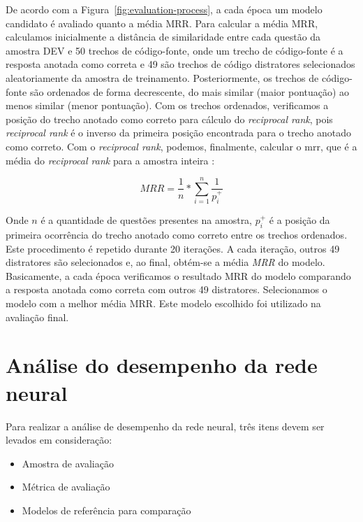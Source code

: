 De acordo com a Figura~\ref{fig:evaluation-process}, a cada época um modelo candidato é avaliado quanto a média MRR. Para calcular a média MRR, calculamos inicialmente a distância de similaridade entre cada questão da amostra DEV e 50 trechos de código-fonte, onde um trecho de código-fonte é a resposta anotada como correta e 49 são trechos de código distratores selecionados aleatoriamente da amostra de treinamento.  Posteriormente, os trechos de código-fonte são ordenados de forma decrescente, do mais similar (maior pontuação) ao menos similar (menor pontuação). Com os trechos ordenados, verificamos a posição do trecho anotado como correto para cálculo do \textit{reciprocal rank}, pois \textit{reciprocal rank} é o inverso da primeira posição encontrada para o trecho anotado como correto. Com o \textit{reciprocal rank}, podemos, finalmente, calcular o \acrshort{mrr}, que é a média do \textit{reciprocal rank} para a amostra inteira \citep{Gu-deep-code-search:2018}:

\begin{equation}\label{eq:mrr}
MRR = \frac{1}{n} * \sum_{i = 1}^{n}\frac{1}{p_{i}^{+}}    
\end{equation}

Onde $n$ é a quantidade de questões presentes na amostra, $p_{i}^{+}$ é a posição da primeira ocorrência do trecho anotado como correto entre os trechos ordenados. Este procedimento é repetido durante 20 iterações. A cada iteração, outros 49 distratores são selecionados e, ao final, obtém-se a média \emph{MRR} do modelo. Basicamente, a cada época verificamos o resultado MRR do modelo comparando a resposta anotada como correta com outros 49 distratores. Selecionamos o modelo com a melhor média MRR. Este modelo escolhido foi utilizado na avaliação final.





\section{Análise do desempenho da rede neural}
\label{sec:analise-do-desempenho-da-rede-neural}

Para realizar a análise de desempenho da rede neural, três itens devem ser levados em consideração:

\begin{itemize}
    \item Amostra de avaliação
    \item Métrica de avaliação
    \item Modelos de referência para comparação
\end{itemize}

